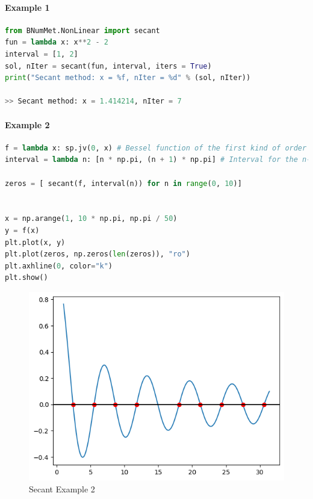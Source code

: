 \paragraph{Example 1}{
\begin{lstlisting}[language=Python]
from BNumMet.NonLinear import secant
fun = lambda x: x**2 - 2
interval = [1, 2]
sol, nIter = secant(fun, interval, iters = True)
print("Secant method: x = %f, nIter = %d" % (sol, nIter))

>> Secant method: x = 1.414214, nIter = 7
\end{lstlisting}
}
\paragraph{Example 2}{
\begin{lstlisting}[language=Python]
f = lambda x: sp.jv(0, x) # Bessel function of the first kind of order 0
interval = lambda n: [n * np.pi, (n + 1) * np.pi] # Interval for the n-th zero

zeros = [ secant(f, interval(n)) for n in range(0, 10)]


x = np.arange(1, 10 * np.pi, np.pi / 50)
y = f(x)
plt.plot(x, y)
plt.plot(zeros, np.zeros(len(zeros)), "ro")
plt.axhline(0, color="k")
plt.show()
\end{lstlisting}
\begin{figure}[H]
    \centering
    \includegraphics{Include/Images/Thesis/Documentation/NonLinear/Secant Example 2.png}
    \caption{Secant Example 2}
    \label{fig:Secant Example 2}
\end{figure}
}